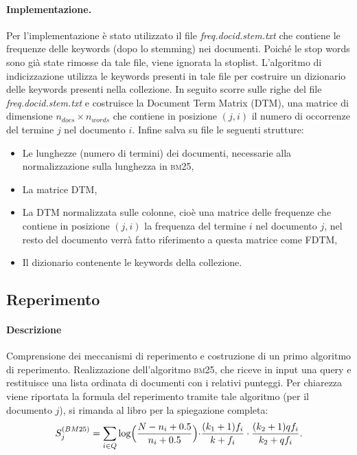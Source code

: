 \paragraph{\textbf{Implementazione.}}
Per l'implementazione \`e stato utilizzato il file \textit{freq.docid.stem.txt} che contiene le frequenze delle keywords (dopo lo stemming) nei documenti. Poich\'e le stop words sono gi\`a state rimosse da tale file, viene ignorata la stoplist. L'algoritmo di indicizzazione utilizza le keywords presenti in tale file per costruire un dizionario delle keywords presenti nella collezione. In seguito scorre sulle righe del file \textit{freq.docid.stem.txt} e costruisce la Document Term Matrix (DTM), una matrice di  dimensione $n_{docs} \times n_{words}$ che contiene in posizione $(j,i)$ il numero di occorrenze del termine $j$ nel documento $i$. Infine salva su file le seguenti strutture:
\begin{itemize}
	\item Le lunghezze (numero di termini) dei documenti, necessarie alla normalizzazione sulla lunghezza in \textsc{bm25},
	\item La matrice DTM,
	\item La DTM normalizzata sulle colonne, cio\`e una matrice delle frequenze che contiene in posizione $(j,i)$ la frequenza del termine $i$ nel documento $j$, nel resto del documento verr\`a fatto riferimento a questa matrice come FDTM,
	\item Il dizionario contenente le keywords della collezione.
\end{itemize}

\subsection{Reperimento}
\label{sec:metodi-di-reper}

\paragraph{\textbf{Descrizione}}
Comprensione dei meccanismi di reperimento e costruzione di un primo algoritmo di reperimento.
Realizzazione dell'algoritmo \textsc{bm25}, che riceve in input una query e restituisce una lista ordinata di documenti con i relativi punteggi. Per chiarezza viene riportata la formula del reperimento tramite tale algoritmo (per il documento $j$), si rimanda al libro \cite{melucci2013information} per la spiegazione completa:
\[ S^{(BM25)}_j = \sum\limits_{i \in Q}\log\Bigl(\frac{N-n_i+0.5}{n_i+0.5}\Bigl)\cdot\frac{(k_1+1)f_i}{k+f_i}\cdot\frac{(k_2+1)qf_i}{k_2+qf_i}. \]


